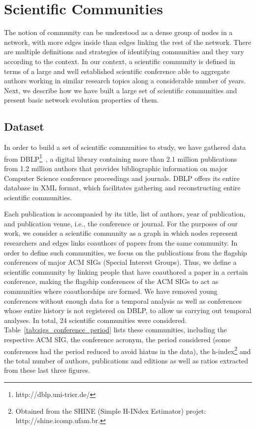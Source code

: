 \section{Scientific Communities}


The notion of community can be understood as a dense group of nodes in a network, with more edges inside than edges linking the rest of the network.  There are multiple definitions and strategies of identifying communities and they vary according to the context. In our context, a scientific community is defined in terms of a large and well established scientific conference able to aggregate authors working in similar research topics along a considerable number of years. Next, we describe how we have built a large set of scientific communities and present basic network evolution properties of them.


\subsection{Dataset}

In order to build a set of scientific communities to study, we have gathered data from DBLP\footnote{http://dblp.uni-trier.de/}~\cite{Ley:2009}, a digital library containing more than 2.1 million publications from 1.2 million authors that provides bibliographic information on major Computer Science conference proceedings and journals.  DBLP offers its entire database in XML format, which facilitates gathering and reconstructing entire scientific communities. 

Each publication is accompanied by its title, list of authors, year of publication, and publication venue, i.e., the conference or journal. For the purposes of our work, we consider a scientific community as a graph in which nodes represent researchers and edges links coauthors of papers from the same community.  In order to define such communities, we focus on the publications from the flagship conferences of major ACM SIGs (Special Interest Groups).  Thus, we define a scientific community by linking people that have coauthored a paper in a certain conference, making the flagship conferences of the ACM SIGs to act as communities where coauthorships are formed. We have removed young conferences without enough data for a temporal analysis as well as conferences whose entire history is not registered on DBLP, to allow us carrying out temporal analyses. In total, 24 scientific communities were considered. Table~\ref{tab:sigs_conference_period} lists these communities, including the respective ACM SIG, the conference acronym, the period considered (some conferences had the period reduced to avoid hiatus in the data), the h-index\footnote{Obtained from the SHINE (Simple H-INdex Estimator) projet: http://shine.icomp.ufam.br.} and the total number of authors, publications and editions as well as ratios extracted from these last three figures.

